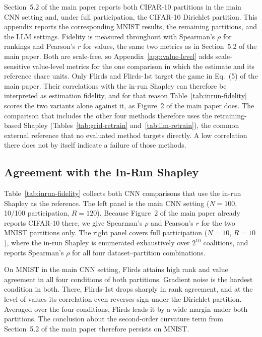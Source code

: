 \documentclass[letterpaper]{article} %
\theoremstyle{definition}
\begin{document}
Section~5.2 of the main paper reports both CIFAR-10 partitions in the main CNN
setting and, under full participation, the CIFAR-10 Dirichlet partition.
This appendix reports the corresponding MNIST results, the
remaining partitions, and the LLM settings. Fidelity is measured throughout with Spearman's $\rho$
for rankings and Pearson's $r$ for values, the same two metrics as in
Section~5.2 of the main paper. Both are scale-free, so
Appendix~\ref{app:value-level} adds scale-sensitive value-level metrics for the
one comparison in which the estimate and its reference share units.
Only Flirds and Flirds-1st target the game in Eq.~(5) of the main paper. Their
correlations with the in-run Shapley can therefore be interpreted as
estimation fidelity, and for that reason Table~\ref{tab:inrun-fidelity}
scores the two variants alone against it, as Figure~2 of the main paper does.
The comparison that includes the other four methods therefore uses the
retraining-based Shapley (Tables~\ref{tab:grid-retrain}
and~\ref{tab:llm-retrain}), the common external
reference that no evaluated method targets directly. A low correlation there
does not by itself indicate a failure of those methods.


\subsection{Agreement with the In-Run Shapley}
\label{app:cnn-main}

Table~\ref{tab:inrun-fidelity} collects both CNN comparisons that use the
in-run Shapley as the reference. The left panel is the main CNN setting
($N{=}100$, 10/100 participation, $R{=}120$). Because
Figure~2 of the main paper already reports CIFAR-10 there, we give Spearman's
$\rho$ and Pearson's $r$ for the two MNIST partitions only. The right panel covers full
participation ($N{=}10$, $R{=}10$), where the in-run Shapley is enumerated
exhaustively over $2^{10}$ coalitions, and reports Spearman's $\rho$ for all
four dataset--partition combinations.

On MNIST in the main CNN setting, Flirds attains high rank and value agreement
in all four conditions of both partitions. Gradient noise is the hardest
condition in both. There, Flirds-1st drops sharply in rank agreement, and at the
level of values its correlation even reverses sign under the Dirichlet
partition. Averaged over the four conditions, Flirds leads it by a wide margin
under both partitions. The conclusion about the
second-order curvature term from Section~5.2 of the main paper therefore persists on MNIST.
\end{document}

